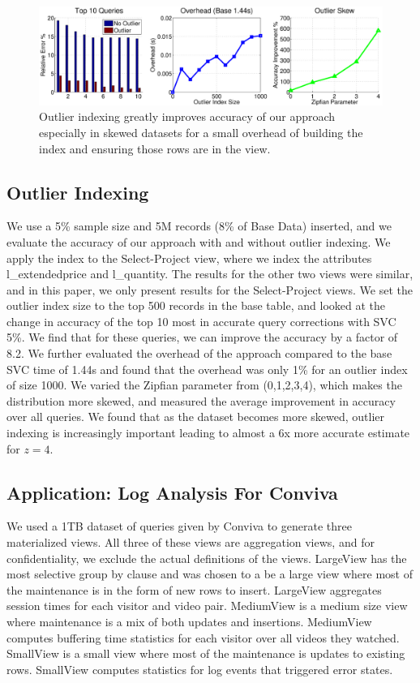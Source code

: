 \begin{figure}[ht!]
\includegraphics[trim = 45mm 0mm 45mm 0mm, clip,width=\columnwidth]{exp/exp6-outlier-full.eps}\vspace{-1em}
 \caption{Outlier indexing greatly improves accuracy of our approach especially in skewed datasets for a small overhead of building the index and ensuring those rows are in the view.\label{exp7outlier}}\vspace{-1em}
\end{figure}

\subsection{Outlier Indexing}
We use a 5\% sample size and 5M records (8\% of Base Data) inserted, and we evaluate the accuracy of our approach with and without outlier indexing.
We apply the index to the Select-Project view, where we index the attributes l\_extendedprice and l\_quantity.
The results for the other two views were similar, and in this paper, we only present results for the Select-Project views.
We set the outlier index size to the top 500 records in the base table, and looked at the change in accuracy of the top 10 most in accurate query corrections with SVC 5\%.
We find that for these queries, we can improve the accuracy by a factor of 8.2.
We further evaluated the overhead of the approach compared to the base SVC time of 1.44s and found that the overhead was only 1\% for an outlier index of size 1000.
We varied the Zipfian parameter from (0,1,2,3,4), which makes the distribution more skewed, and measured the average improvement in accuracy over all queries.
We found that as the dataset becomes more skewed, outlier indexing is increasingly important leading to almost a 6x more accurate estimate for $z=4$.

\subsection{Application: Log Analysis For Conviva}
We used a 1TB dataset of queries given by Conviva to generate three materialized views.
All three of these views are aggregation views, and for confidentiality, we exclude the actual definitions of the views.
LargeView has the most selective group by clause and was chosen to a be a large view where most of the maintenance is in the form of new rows to insert.
LargeView aggregates session times for each visitor and video pair.
MediumView is a medium size view where maintenance is a mix of both updates and insertions.
MediumView computes buffering time statistics for each visitor over all videos they watched.
SmallView is a small view where most of the maintenance is updates to existing rows.
SmallView computes statistics for log events that triggered error states.

